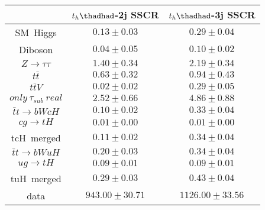 \centering
\begin{tabular}{ccc} \toprule\toprule
 & $t_{h}\thadhad$-2j SSCR & $t_{h}\thadhad$-3j SSCR \\  \midrule
SM~Higgs & $0.13\pm0.03$ & $0.29\pm0.04$\\
Diboson & $0.04\pm0.05$ & $0.10\pm0.02$\\
$Z\to\tau\tau$ & $1.40\pm0.34$ & $2.19\pm0.34$\\
$t\bar{t}$ & $0.63\pm0.32$ & $0.94\pm0.43$\\
$t\bar{t}V$ & $0.02\pm0.02$ & $0.29\pm0.05$\\
$only~\tau_{sub}~real$ & $2.52\pm0.66$ & $4.86\pm0.88$\\
$\bar{t}t\to bWcH$ & $0.10\pm0.02$ & $0.33\pm0.04$\\
$cg\to tH$ & $0.01\pm0.00$ & $0.01\pm0.00$\\ \midrule
tcH~merged & $0.11\pm0.02$ & $0.34\pm0.04$\\
$\bar{t}t\to bWuH$ & $0.20\pm0.03$ & $0.34\pm0.04$\\
$ug\to tH$ & $0.09\pm0.01$ & $0.09\pm0.01$\\
tuH~merged & $0.29\pm0.03$ & $0.43\pm0.04$\\\midrule
data & $943.00\pm30.71$ & $1126.00\pm33.56$\\
\bottomrule\bottomrule
\end{tabular}


